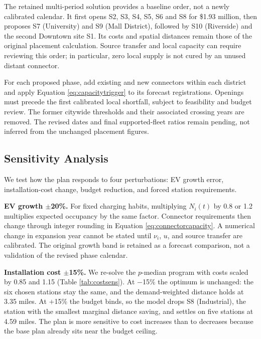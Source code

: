 \documentclass[12pt]{article}
\begin{document}
The retained multi-period solution provides a baseline order, not a newly calibrated
calendar. It first opens S2, S3, S4, S5, S6 and S8 for \$1.93 million, then proposes
S7 (University) and S9 (Mall District), followed by S10 (Riverside) and the second
Downtown site S1. Its costs and spatial distances remain those of the original
placement calculation. Source transfer and local capacity can require reviewing this
order; in particular, zero local supply is not cured by an unused distant connector.

For each proposed phase, add existing and new connectors within each district and
apply Equation \ref{eq:capacitytrigger} to its forecast registrations. Openings must
precede the first calibrated local shortfall, subject to feasibility and budget review.
The former citywide thresholds and their associated crossing years are removed. The
revised dates and final supported-fleet ratios remain pending, not inferred from the
unchanged placement figures.

\subsection{Sensitivity Analysis}
\label{sec:expansionsensitivity}

We test how the plan responds to four perturbations: EV growth error, installation-cost
change, budget reduction, and forced station requirements.

\textbf{EV growth $\pm$20\%.} For fixed charging habits, multiplying $N_i(t)$ by 0.8
or 1.2 multiplies expected occupancy by the same factor. Connector requirements then
change through integer rounding in Equation \ref{eq:connectorcapacity}. A numerical
change in expansion year cannot be stated until $\nu_i$, $u$, and source transfer are
calibrated. The original growth band is retained as a forecast comparison, not a
validation of the revised phase calendar.

\textbf{Installation cost $\pm$15\%.} We re-solve the $p$-median program with costs scaled
by 0.85 and 1.15 (Table \ref{tab:costsens}). At $-$15\% the optimum is unchanged: the six
chosen stations stay the same, and the demand-weighted distance holds at 3.35 miles. At
$+$15\% the budget binds, so the model drops S8 (Industrial), the station with the smallest
marginal distance saving, and settles on five stations at 4.59 miles. The plan is more
sensitive to cost increases than to decreases because the base plan already sits near the
budget ceiling.
\end{document}
